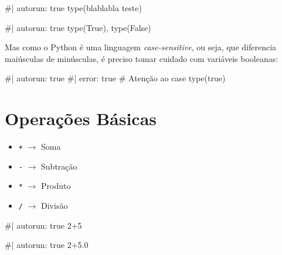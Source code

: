 \documentclass[
  letterpaper,
  DIV=11,
  numbers=noendperiod]{scrreprt}
\newenvironment{Shaded}{\begin{snugshade}}{\end{snugshade}}
\newcommand{\NormalTok}[1]{\textcolor[rgb]{0.00,0.23,0.31}{#1}}
\providecommand{\tightlist}{%
  \setlength{\itemsep}{0pt}\setlength{\parskip}{0pt}}
\begin{document}
\begin{Shaded}
\begin{Highlighting}[]
\NormalTok{\#| autorun: true}
\NormalTok{type(\textquotesingle{}blablabla teste\textquotesingle{})}
\end{Highlighting}
\end{Shaded}

\begin{Shaded}
\begin{Highlighting}[]
\NormalTok{\#| autorun: true}
\NormalTok{type(True), type(False)}
\end{Highlighting}
\end{Shaded}

Mas como o Python é uma linguagem \emph{case-sensitive}, ou seja, que
diferencia maiúsculas de minúsculas, é preciso tomar cuidado com
variáveis booleanas:

\begin{Shaded}
\begin{Highlighting}[]
\NormalTok{\#| autorun: true}
\NormalTok{\#| error: true}
\NormalTok{\# Atenção ao case}
\NormalTok{type(true)}
\end{Highlighting}
\end{Shaded}

\section{Operações Básicas}\label{operauxe7uxf5es-buxe1sicas}

\begin{itemize}
\tightlist
\item
  \texttt{+} \(\rightarrow\) Soma
\item
  \texttt{-} \(\rightarrow\) Subtração
\item
  \texttt{*} \(\rightarrow\) Produto
\item
  \texttt{/} \(\rightarrow\) Divisão
\end{itemize}

\begin{Shaded}
\begin{Highlighting}[]
\NormalTok{\#| autorun: true}
\NormalTok{2+5}
\end{Highlighting}
\end{Shaded}

\begin{Shaded}
\begin{Highlighting}[]
\NormalTok{\#| autorun: true}
\NormalTok{2+5.0}
\end{Highlighting}
\end{Shaded}
\end{document}
